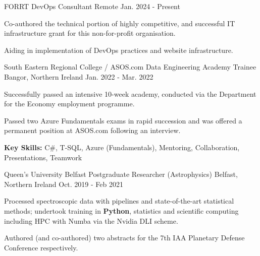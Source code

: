 \begin{cventries}

  \cventry
  	{FORRT} %
    {DevOps Consultant} %
    {Remote} %
    {Jan. 2024 - Present} %
    {
    \begin{cvitems}
		\item {Co-authored the technical portion of highly competitive, and successful IT infrastructure grant for this non-for-profit organisation.}
		\item {Aiding in implementation of DevOps practices and website infrastructure.}
     \end{cvitems}
    }

  \cventry
  	{South Eastern Regional College / ASOS.com} %
    {Data Engineering Academy Trainee} %
    {Bangor, Northern Ireland} %
    {Jan. 2022 - Mar. 2022} %
    {
      \begin{cvitems} %
        \item {Successfully passed an intensive 10-week academy, conducted via the Department for the Economy employment programme.}
        \item {Passed two Azure Fundamentals exams in rapid succession and was offered a permanent position at ASOS.com following an interview.}
        \item {\textbf{Key Skills:} C\#, T-SQL, Azure (Fundamentals), Mentoring, Collaboration, Presentations, Teamwork}
      \end{cvitems}
    }

  \cventry
    {Queen's University Belfast} %
    {Postgraduate Researcher (Astrophysics)} %
    {Belfast, Northern Ireland} %
    {Oct. 2019 - Feb 2021} %
    {
      \begin{cvitems} %
        \item {Processed spectroscopic data with pipelines and state-of-the-art statistical methods; undertook training in \textbf{Python}, statistics and scientific computing including HPC with Numba via the Nvidia DLI scheme.}
        \item {Authored (and co-authored) two abstracts for the 7th IAA Planetary Defense Conference respectively.}
      \end{cvitems}
    }
    

\end{cventries}
